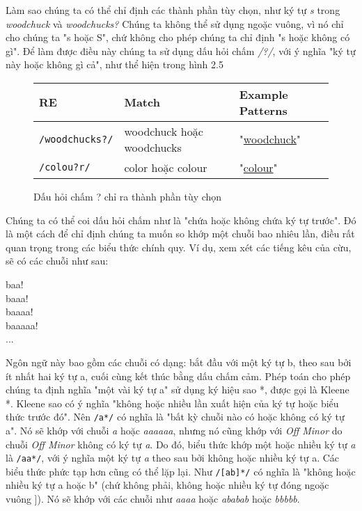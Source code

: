 Làm sao chúng ta có thể chỉ định các thành phần tùy chọn, như ký tự \textit{s} trong \textit{woodchuck} và \textit{woodchucks?} Chúng ta không thể sử dụng ngoặc vuông, vì nó chỉ cho chúng ta "s hoặc S", chứ không cho phép chúng ta chỉ định "s hoặc không có gì". Để làm được điều này chúng ta sử dụng dấu hỏi chấm \textit{/?/}, với ý nghĩa "ký tự này hoặc không gì cả", như thể hiện trong hình 2.5

\begin{figure}[h]
	\begin{tabular}{ l l l }
	 \hline
	 RE & Match & Example Patterns \\
	 \hline
	 \verb|/woodchucks?/| & woodchuck hoặc woodchucks & "\underline{woodchuck}" \\
	 \verb|/colou?r/| & color hoặc colour & "\underline{colour}" \\
	 \hline
	\end{tabular}
 \caption{Dấu hỏi chấm ? chỉ ra thành phần tùy chọn}
 \label{table:2.5}
\end{figure}

Chúng ta có thể coi dấu hỏi chấm như là "chứa hoặc không chứa ký tự trước". Đó là một cách để chỉ định chúng ta muốn so khớp một chuỗi bao nhiêu lần, điều rất quan trọng trong các biểu thức chính quy. Ví dụ, xem xét các tiếng kêu  của cừu, sẽ có các chuỗi như sau:

baa!\\
\indent baaa!\\
\indent baaaa!\\
\indent baaaaa!\\
\indent ...

Ngôn ngữ này bao gồm các chuỗi có dạng: bắt đầu với một ký tự b, theo sau bởi ít nhất hai ký tự a, cuối cùng kết thúc bằng dấu chấm cảm. Phép toán cho phép chúng ta định nghĩa "một vài ký tự a" sử dụng ký hiệu sao *, được gọi là Kleene *. Kleene sao có ý nghĩa "không hoặc nhiều lần xuất hiện của ký tự hoặc biểu thức trước đó". Nên \verb|/a*/| có nghĩa là "bất kỳ chuỗi nào có hoặc không có ký tự a". Nó sẽ khớp với chuỗi \textit{a} hoặc \textit{aaaaaa}, nhưng nó cũng khớp với \textit{Off Minor} do chuỗi \textit{Off Minor} không có ký tự \textit{a}. Do đó, biểu thức khớp một hoặc nhiều ký tự \textit{a} là \verb|/aa*/|, với ý nghĩa một ký tự \textit{a} theo sau bởi không hoặc nhiều ký tự a. Các biểu thức phức tạp hơn cũng có thể lặp lại. Như \verb|/[ab]*/| có nghĩa là "không hoặc nhiều ký tự a hoặc b" (chứ không phải, không hoặc nhiều ký tự đóng ngoặc vuông ]). Nó sẽ khớp với các chuỗi như \textit{aaaa} hoặc \textit{ababab} hoặc \textit{bbbbb}.

